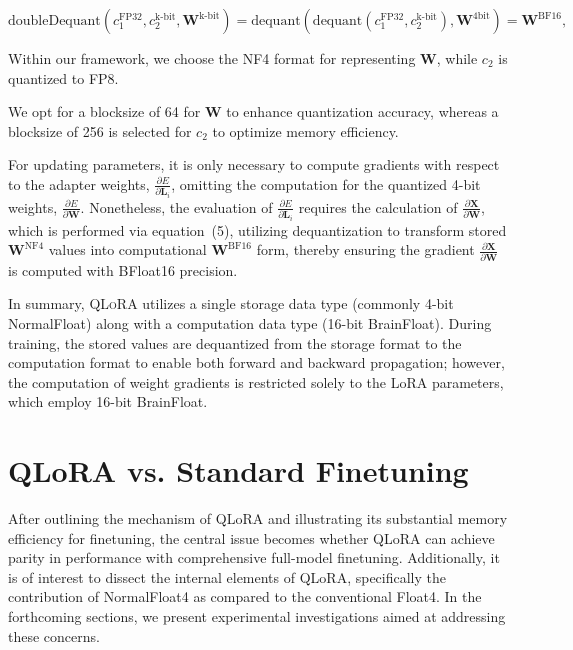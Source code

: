 \begin{equation}
    \text{doubleDequant}(c_1^{\text{FP32}}, c_2^{\text{k-bit}}, \mathbf{W}^{\text{k-bit}}) = \text{dequant}(\text{dequant}(c_1^{\text{FP32}}, c_2^{\text{k-bit}}), \mathbf{W}^{\text{4bit}}) = \mathbf{W}^{\text{BF16}},
\end{equation}

Within our framework, we choose the NF4 format for representing $\mathbf{W}$, while $c_2$ is quantized to FP8.

We opt for a blocksize of 64 for $\mathbf{W}$ to enhance quantization accuracy, whereas a blocksize of 256 is selected for $c_2$ to optimize memory efficiency.

For updating parameters, it is only necessary to compute gradients with respect to the adapter weights, $\frac{\partial E}{\partial \mathbf{L}_i}$, omitting the computation for the quantized 4-bit weights, $\frac{\partial E}{\partial \mathbf{W}}$. Nonetheless, the evaluation of $\frac{\partial E}{\partial \mathbf{L}_i}$ requires the calculation of $\frac{\partial \mathbf{X}}{\partial \mathbf{W}}$, which is performed via equation~(5), utilizing dequantization to transform stored $\mathbf{W}^{\text{NF4}}$ values into computational $\mathbf{W}^{\text{BF16}}$ form, thereby ensuring the gradient $\frac{\partial \mathbf{X}}{\partial \mathbf{W}}$ is computed with BFloat16 precision.

In summary, \textsc{QLoRA} utilizes a single storage data type (commonly 4-bit NormalFloat) along with a computation data type (16-bit BrainFloat). During training, the stored values are dequantized from the storage format to the computation format to enable both forward and backward propagation; however, the computation of weight gradients is restricted solely to the LoRA parameters, which employ 16-bit BrainFloat.

\section{QLoRA vs. Standard Finetuning}
\label{sec:comp_to_std}

After outlining the mechanism of QLoRA and illustrating its substantial memory efficiency for finetuning, the central issue becomes whether QLoRA can achieve parity in performance with comprehensive full-model finetuning. Additionally, it is of interest to dissect the internal elements of QLoRA, specifically the contribution of NormalFloat4 as compared to the conventional Float4. In the forthcoming sections, we present experimental investigations aimed at addressing these concerns.

